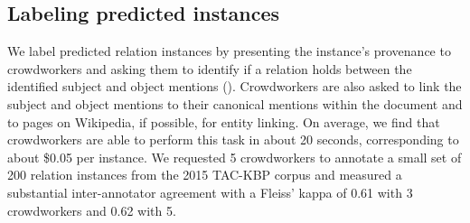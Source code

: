 \subsection{Labeling predicted instances}
We label predicted relation instances by presenting the instance's provenance to crowdworkers
  and asking them to identify if a relation holds between the identified subject and object mentions (). 
  Crowdworkers are also asked to link the subject and object mentions to their canonical mentions within the document and to pages on Wikipedia, if possible, for entity linking.
On average, we find that crowdworkers are able to perform this task in about 20 seconds, corresponding to about \$0.05 per instance.
We requested 5 crowdworkers to annotate a small set of 200 relation instances from the 2015 TAC-KBP corpus 
and measured a substantial inter-annotator agreement with a Fleiss' kappa of 0.61 with 3 crowdworkers and 0.62 with 5. %

